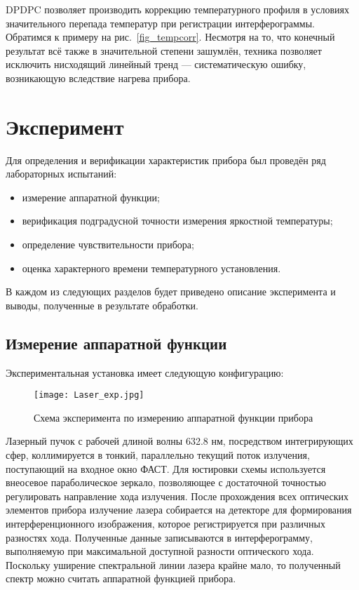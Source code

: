 \documentclass{mipt-thesis-bs}
\begin{document}
  	DPDPC позволяет производить коррекцию температурного профиля в условиях значительного перепада температур при регистрации интерферограммы. Обратимся к примеру на рис.~\ref{fig_tempcorr}. Несмотря на то, что конечный результат всё также в значительной степени зашумлён, техника позволяет исключить нисходящий линейный тренд --- систематическую ошибку, возникающую вследствие нагрева прибора.
  	
	\chapter{Эксперимент}
	
	Для определения и верификации характеристик прибора был проведён ряд лабораторных испытаний:
	\begin{itemize}
		\item измерение аппаратной функции; 
		\item верификация подградусной точности измерения яркостной температуры;
		\item определение чувствительности прибора;
		\item оценка характерного времени температурного установления.
	\end{itemize}

В каждом из следующих разделов будет приведено описание эксперимента и выводы, полученные в результате обработки.
	\section{Измерение аппаратной функции}	
	Экспериментальная установка имеет следующую конфигурацию:
\begin{figure}[h!]
	\centering
	\texttt{[image: Laser\_exp.jpg]}
	\caption{Схема эксперимента по измерению аппаратной функции прибора}
\end{figure}

Лазерный пучок с рабочей длиной волны 632.8 нм, посредством интегрирующих сфер, коллимируется в тонкий, параллельно текущий поток излучения, поступающий на входное окно ФАСТ. Для юстировки схемы используется внеосевое параболическое зеркало, позволяющее с достаточной точностью регулировать направление хода излучения. После прохождения всех оптических элементов прибора излучение лазера собирается на детекторе для формирования интерференционного изображения, которое регистрируется при различных разностях хода. Полученные данные записываются в интерферограмму, выполняемую при максимальной доступной разности оптического хода. Поскольку уширение спектральной линии лазера крайне мало, то полученный спектр можно считать аппаратной функцией прибора.
\end{document}
